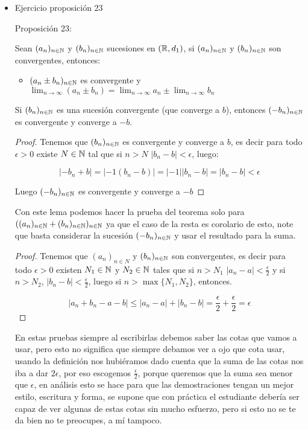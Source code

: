 \begin{itemize}[label={✎},leftmargin=*]
\item Ejercicio proposición 23\\

\begin{theorem}{Proposición 23:}

Sean $(a_n)_{n\in \mathbb{N}}$ y $(b_n)_{n\in \mathbb{N}}$ sucesiones en $(\mathbb{R},d_1)$, si $(a_n)_{n\in \mathbb{N}}$ y $(b_n)_{n \in \mathbb{N}}$ son convergentes, entonces:

\begin{itemize}
    \item $(a_n\pm b_n)_{n\in \mathbb{N}}$ es convergente y $\lim_{n \to \infty}(a_n\pm b_n)=\lim_{n \to \infty} a_n\pm \lim_{n \to \infty} b_n $
\end{itemize}
\end{theorem}

\begin{lemma}
Si $(b_n)_{n\in \mathbb{N}}$ es una sucesión convergente (que converge a $b$), entonces $(-b_n)_{n\in \mathbb{N}}$ es convergente y converge a $-b$.
\end{lemma}

\begin{proof}
Tenemos que $(b_n)_{n\in \mathbb{N}}$ es convergente y converge a $b$, es decir para todo $\epsilon>0$ existe $N\in \mathbb{N}$ tal que si $n>N$ $|b_n-b|<\epsilon$, luego:

$$|-b_n+b|=|-1(b_n-b)|=|-1||b_n-b|=|b_n-b|<\epsilon$$

Luego $(-b_n)_{n\in\mathbb{N}}$ es convergente y converge a $-b$
\end{proof}

Con este lema podemos hacer la prueba del teorema solo para $((a_n)_{n\in \mathbb{N}}+(b_n)_{n\in \mathbb{N}})_{n\in \mathbb{N}}$ ya que el caso de la resta es corolario de esto, note que basta considerar la sucesión $(-b_n)_{n\in \mathbb{N}}$ y usar el resultado para la suma.

\begin{proof}
    Tenemos que $(a_n)_{n\in N}$ y $(b_n)_{n\in \mathbb{N}}$ son convergentes, es decir para todo $\epsilon>0$ existen $N_1\in \mathbb{N}$ y $N_2\in \mathbb{N}$ tales que si $n>N_1$ $|a_n-a|<\frac{\epsilon}{2}$ y si $n>N_2$, $|b_n-b|<\frac{\epsilon}{2}$, luego si $n>\max\{N_1,N_2\}$, entonces.

    $$|a_n+b_n-a-b|\leq |a_n-a|+|b_n-b|=\frac{\epsilon}{2}+\frac{\epsilon}{2}=\epsilon$$
\end{proof}

\begin{note}
En estas pruebas siempre al escribirlas debemos saber las cotas que vamos a usar, pero esto no significa que siempre debamos ver a ojo que cota usar, usando la definición nos hubiéramos dado cuenta que la suma de las cotas nos iba a dar $2\epsilon$, por eso escogemos $\frac{\epsilon}{2}$, porque queremos que la suma sea menor que $\epsilon$, en análisis esto se hace para que las demostraciones tengan un mejor estilo, escritura y forma, se supone que con práctica el estudiante debería ser capaz de ver algunas de estas cotas sin mucho esfuerzo, pero si esto no se te da bien no te preocupes, a mí tampoco.
\end{note} 


\end{itemize}
